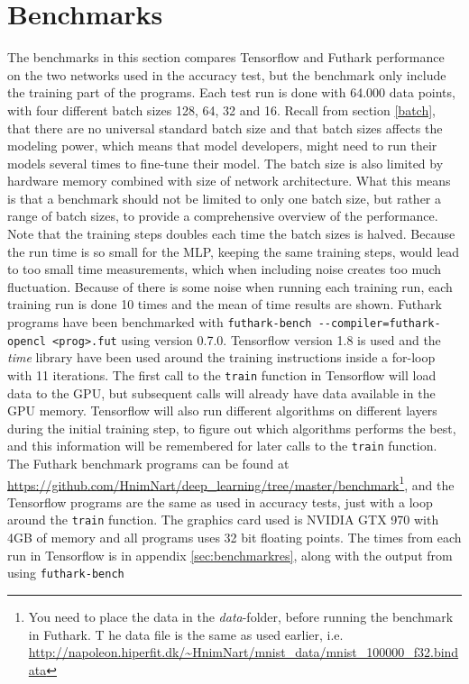 {	\chapter{Benchmarks}
	\label{benchmark}
	The benchmarks in this section compares Tensorflow and Futhark performance on
	the two networks used in the accuracy test, but the benchmark only include the
	training part of the programs. Each test run is done with 64.000 data points,
	with four different batch sizes 128, 64, 32 and 16. 
	Recall from section \ref{batch}, that there are no universal standard batch size
	and that batch sizes affects the modeling power, which means that model
	developers, might need to run their models several times to fine-tune their
	model. 
	The batch size is also limited by hardware memory combined with size of network
	architecture. 
	What this means is that a benchmark should not be limited to only one batch
	size, but rather a range of batch sizes, to provide a comprehensive overview of
	the performance. \newline 
	Note that the training steps doubles each time the batch sizes is halved. 
	Because the run time is so small for the MLP, keeping the same training steps,
	would lead to too small time measurements, which when including noise creates
	too much fluctuation. 
	Because of there is some noise when running each training run, each training run
	is done 10 times and the mean of time results are shown. 
	Futhark programs have been benchmarked with \texttt{futhark-bench
		-{}-compiler=futhark-opencl <prog>.fut} using version 0.7.0. Tensorflow version
	1.8 is used and the \emph{time} library have been used around the training
	instructions inside a for-loop with 11 iterations. 
	The first call to the \texttt{train} function in Tensorflow will load data to
	the GPU, but subsequent calls will already have data available in the GPU
	memory. 
	Tensorflow will also run different algorithms on different layers during the
	initial training step, to figure out which algorithms performs the best, and
	this information will be remembered for later calls to the \texttt{train}
	function\cite[p.60]{Performance}. 
	The Futhark benchmark programs can be found at
	\url{https://github.com/HnimNart/deep_learning/tree/master/benchmark}\footnote{You
		need to place the data in the \emph{data}-folder, before running the benchmark
		in Futhark. T
		he data file is the same as used earlier, i.e.
		\url{http://napoleon.hiperfit.dk/~HnimNart/mnist_data/mnist\_100000\_f32.bindata}},
	and the Tensorflow programs are the same as used in accuracy tests, just with a
	loop around the \texttt{train} function. 
	The graphics card used is NVIDIA GTX 970 with 4GB of memory and all programs
	uses 32 bit floating points. 
	The times from each run in Tensorflow  is in appendix \ref{sec:benchmarkres},
	along with the output from using \texttt{futhark-bench}
	
}
